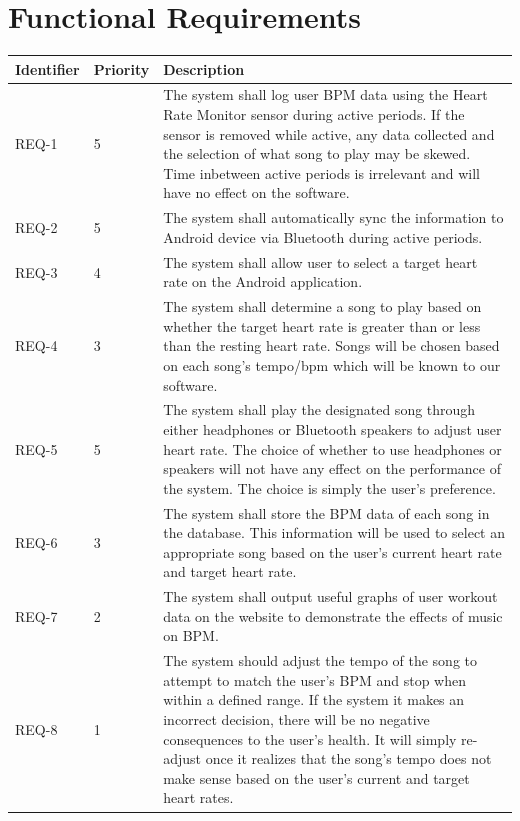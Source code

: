\documentclass[letterpaper,english, 12pt]{scrreprt}
\begin{document}
\section{Functional Requirements}
\begin{center}
	\begin{tabular}{|C{2cm}|C{2cm}|C{8cm}|}
		\hline
			Identifier & Priority & Description\\
		\hline
			REQ-1 & 5 & The system shall log user BPM data using the Heart Rate Monitor sensor during active periods. If the sensor is removed while active, any data collected and the selection of what song to play may be skewed. Time inbetween active periods is irrelevant and will have no effect on the software.\\
		\hline
			REQ-2 & 5 & The system shall automatically sync the information to Android device via Bluetooth during active periods.\\
		\hline
			REQ-3 & 4 & The system shall allow user to select a target heart rate on the Android application.\\
		\hline
			REQ-4 & 3 & The system shall determine a song to play based on whether the target heart rate is greater than or less than the resting heart rate. Songs will be chosen based on each song's tempo/bpm which will be known to our software.\\
		\hline
			REQ-5 & 5 & The system shall play the designated song through either headphones or Bluetooth speakers to adjust user heart rate. The choice of whether to use headphones or speakers will not have any effect on the performance of the system. The choice is simply the user's preference.\\
		\hline
			REQ-6 & 3 & The system shall store the BPM data of each song in the database. This information will be used to select an appropriate song based on the user's current heart rate and target heart rate.\\
		\hline
			REQ-7 & 2 & The system shall output useful graphs of user workout data on the website to demonstrate the effects of music on BPM.\\
		\hline
			REQ-8 & 1 & The system should adjust the tempo of the song to attempt to match the user's BPM and stop when within a defined range. If the system it makes an incorrect decision, there will be no negative consequences to the user's health. It will simply re-adjust once it realizes that the song's tempo does not make sense based on the user's current and target heart rates.\\
		\hline

\end{tabular}
\end{center}
\end{document}
